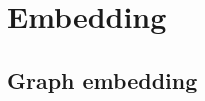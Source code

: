 \chapter{Embedding}\label{chap:embedding}

\section{Graph embedding}\label{sec:embedding:graph_embedding}